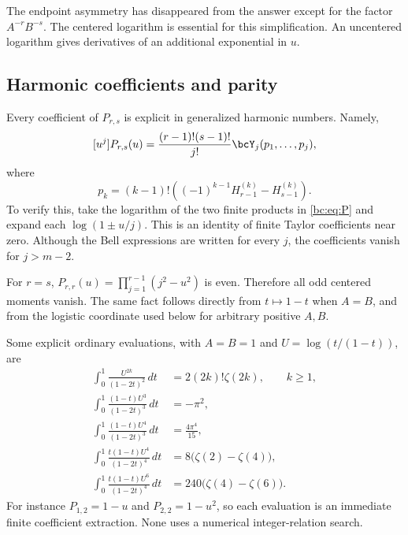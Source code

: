 The endpoint asymmetry has disappeared from the answer except for the
factor $A^{-r}B^{-s}$. The centered logarithm is essential for this
simplification. An uncentered logarithm gives derivatives of an
additional exponential in $u$.

\subsection{Harmonic coefficients and parity}

Every coefficient of $P_{r,s}$ is explicit in generalized harmonic
numbers. Namely,
\begin{equation}\label{bc:eq:P-bell}
 [u^j]P_{r,s}(u)=\frac{(r-1)!(s-1)!}{j!}
               \bcY_j(p_1,\ldots,p_j),
\end{equation}
where
\begin{equation}\label{bc:eq:p-harmonic}
 p_k=(k-1)!\left((-1)^{k-1}H_{r-1}^{(k)}-H_{s-1}^{(k)}\right).
\end{equation}
To verify this, take the logarithm of the two finite products in
\eqref{bc:eq:P} and expand each $\log(1\pm u/j)$. This is an identity
of finite Taylor coefficients near zero. Although the Bell expressions
are written for every $j$, the coefficients vanish for $j>m-2$.

For $r=s$, $P_{r,r}(u)=\prod_{j=1}^{r-1}(j^2-u^2)$ is even. Therefore
all odd centered moments vanish. The same fact follows directly from
$t\mapsto1-t$ when $A=B$, and from the logistic coordinate used below
for arbitrary positive $A,B$.

Some explicit ordinary evaluations, with $A=B=1$ and
$U=\log(t/(1-t))$, are
\begin{align}
 \int_0^1\frac{U^{2k}}{(1-2t)^2}\,dt
     &=2(2k)!\zeta(2k),\qquad k\ge1,
                      \label{bc:eq:moment-11}\\
 \int_0^1\frac{(1-t)U^3}{(1-2t)^3}\,dt&=-\pi^2,
                      \label{bc:eq:moment-12a}\\
 \int_0^1\frac{(1-t)U^4}{(1-2t)^3}\,dt&=\frac{4\pi^4}{15},
                      \label{bc:eq:moment-12b}\\
 \int_0^1\frac{t(1-t)U^4}{(1-2t)^4}\,dt
       &=8\bigl(\zeta(2)-\zeta(4)\bigr),
                      \label{bc:eq:moment-22a}\\
 \int_0^1\frac{t(1-t)U^6}{(1-2t)^4}\,dt
       &=240\bigl(\zeta(4)-\zeta(6)\bigr).
                      \label{bc:eq:moment-22b}
\end{align}
For instance $P_{1,2}=1-u$ and $P_{2,2}=1-u^2$, so each evaluation is
an immediate finite coefficient extraction. None uses a numerical
integer-relation search.

